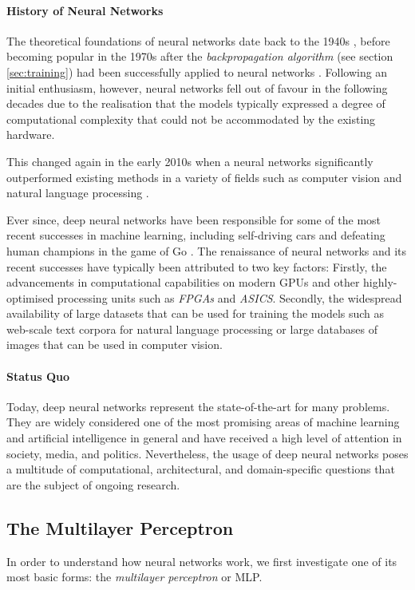 \paragraph{History of Neural Networks}The theoretical foundations of neural networks date back to the 1940s \cite{nn-history}, before becoming popular in the 1970s after the \emph{backpropagation algorithm} (see section \ref{sec:training}) had been successfully applied to neural networks  \cite{backprop1}. Following an initial enthusiasm, however, neural networks fell out of favour in the following decades due to the realisation that the models typically expressed a degree of computational complexity that could not be accommodated by the existing hardware.

This changed again in the early 2010s when a neural networks significantly outperformed existing methods in a variety of fields such as computer vision \cite{imagenet} and natural language processing \cite{nlp}. %

Ever since, deep neural networks have been responsible for some of the most recent successes in machine learning, including self-driving cars and defeating human champions in the game of Go \cite{alphago}.
The renaissance of neural networks and its recent successes have typically been attributed to two key factors: Firstly, the advancements in computational capabilities on modern GPUs and other highly-optimised processing units such as \emph{FPGAs} and \emph{ASICS}.
Secondly, the widespread availability of large datasets that can be used for training the models such as web-scale text corpora for natural language processing or large databases of images that can be used in computer vision. 

\paragraph{Status Quo} Today, deep neural networks represent the state-of-the-art for many problems. They are widely considered one of the most promising areas of machine learning and artificial intelligence in general and have received a high level of attention in society, media, and politics. Nevertheless, the usage of deep neural networks poses a multitude of computational, architectural, and domain-specific questions that are the subject of ongoing research. 

\subsection{The Multilayer Perceptron} \label{sec:mlp}
In order to understand how neural networks work, we first investigate one of its most basic forms: the \emph{multilayer perceptron} or MLP. 

